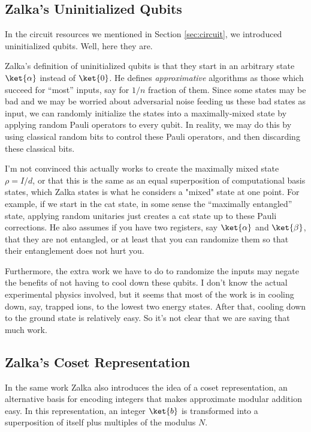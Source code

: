 \subsection{Zalka's Uninitialized Qubits}

In the circuit resources we mentioned in Section \ref{sec:circuit},
we introduced uninitialized qubits. Well, here they are.

Zalka's definition of uninitialized qubits is that they start in an
arbitrary state $\ket{\alpha}$ instead of $\ket{0}$. He defines
\emph{approximative} algorithms as those which succeed for ``most'' inputs,
say for $1/n$ fraction of them. Since some states may be bad and we may be
worried about adversarial noise feeding us these bad states as input, we can
randomly initialize the states into a maximally-mixed state by applying
random Pauli operators to every qubit. In reality, we may do this by
using classical random bits to control these Pauli operators, and then discarding
these classical bits.

I'm not convinced this actually works to create the maximally mixed state
$\rho = I / d$, or that this is the same as an equal superposition of computational
basis states, which Zalka states is what he considers a "mixed" state at one
point. For example, if we start in the cat state, in some sense the
``maximally entangled'' state, applying random unitaries just creates a
cat state up to these Pauli corrections. He also assumes if you have two
registers, say $\ket{\alpha}$ and $\ket{\beta}$, that they are not entangled,
or at least that you can randomize them so that their entanglement does not
hurt you.

Furthermore, the extra work we have to do to randomize the inputs may
negate the benefits of not having to cool down these qubits. I don't know
the actual experimental physics involved, but it seems that most of the work
is in cooling down, say, trapped ions, to the lowest two energy states.
After that, cooling down to the ground state is relatively easy. So it's not
clear that we are saving that much work.

\subsection{Zalka's Coset Representation}

In the same work \cite{Zalka2002} Zalka also introduces the idea of a
coset representation, an alternative basis for encoding integers that
makes approximate modular addition easy. In this representation,
an integer $\ket{b}$ is transformed into a superposition of itself
plus multiples of the modulus $N$.


